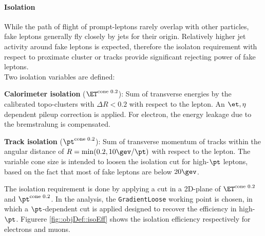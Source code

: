

\paragraph{Isolation}
While the path of flight of prompt-leptons rarely overlap with other particles, fake leptons generally fly closely by jets for their origin. Relatively higher jet activity around fake leptons is expected, therefore the isolaton requirement with respect to proximate cluster or tracks provide significant rejecting power of fake leptons. \\

Two isolation variables are defined:

\begin{description}
\item {\textbf{Calorimeter isolation} ($\etcone$)}: Sum of transverse energies by the calibrated topo-clusters 
with  $\Delta R<0.2$ with respect to the lepton. An $\et,\eta$ dependent pileup correction is applied. For electron, the energy leakage due to the bremstralung is compensated. 

\item {\textbf{Track isolation} ($\ptcone$)}: Sum of transverse momentum of tracks within the angular distance of $R=\min(0.2, 10\gev/\pt)$ with respect to the lepton. The variable cone size is intended to loosen the isolation cut for high-$\pt$ leptons, based on the fact that most of fake leptons are below $20\gev$.
\end{description}

The isolation requirement is done by applying a cut in a 2D-plane of $\etcone$ and $\ptcone$. 
In the analysis, the \texttt{GradientLoose} working point is chosen, in which a $\pt$-dependent cut is applied designed to recover the efficiency in high-$\pt$. Figurere \ref{fig::objDef::isoEff}  shows the isolation efficiency respectively for electrons and muons. \\

